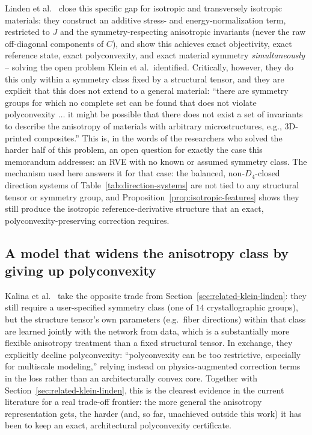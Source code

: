 \documentclass[10pt,a4paper]{article}
\begin{document}
Linden et al.~\cite{Linden2023} close this specific gap for isotropic and
transversely isotropic materials: they construct an additive stress- and
energy-normalization term, restricted to $J$ and the symmetry-respecting
anisotropic invariants (never the raw off-diagonal components of $C$), and
show this achieves exact objectivity, exact reference state, exact
polyconvexity, and exact material symmetry \emph{simultaneously} -- solving
the open problem Klein et al.\ identified.  Critically, however, they do
this only within a symmetry class fixed by a structural tensor, and they
are explicit that this does not extend to a general material: ``there are
symmetry groups for which no complete set can be found that does not
violate polyconvexity $\dots$ it might be possible that there does not
exist a set of invariants to describe the anisotropy of materials with
arbitrary microstructures, e.g., 3D-printed composites.'' This is, in the
words of the researchers who solved the harder half of this problem, an
open question for exactly the case this memorandum addresses: an RVE with
no known or assumed symmetry class.  The mechanism used here answers it
for that case: the balanced, non-$D_4$-closed direction systems of
Table~\ref{tab:direction-systems} are not tied to any structural tensor or
symmetry group, and Proposition~\ref{prop:isotropic-features} shows they
still produce the isotropic reference-derivative structure that an exact,
polyconvexity-preserving correction requires.

\subsection{A model that widens the anisotropy class by giving up polyconvexity}
\label{sec:related-kalina}
Kalina et al.~\cite{Kalina2024} take the opposite trade from
Section~\ref{sec:related-klein-linden}: they still require a user-specified
symmetry class (one of $14$ crystallographic groups), but the structure
tensor's own parameters (e.g.\ fiber directions) within that class are
learned jointly with the network from data, which is a substantially more
flexible anisotropy treatment than a fixed structural tensor. In exchange,
they explicitly decline polyconvexity: ``polyconvexity can be too
restrictive, especially for multiscale modeling,'' relying instead on
physics-augmented correction terms in the loss rather than an
architecturally convex core. Together with
Section~\ref{sec:related-klein-linden}, this is the clearest evidence in
the current literature for a real trade-off frontier: the more general the
anisotropy representation gets, the harder (and, so far, unachieved outside
this work) it has been to keep an exact, architectural polyconvexity
certificate.
\end{document}
